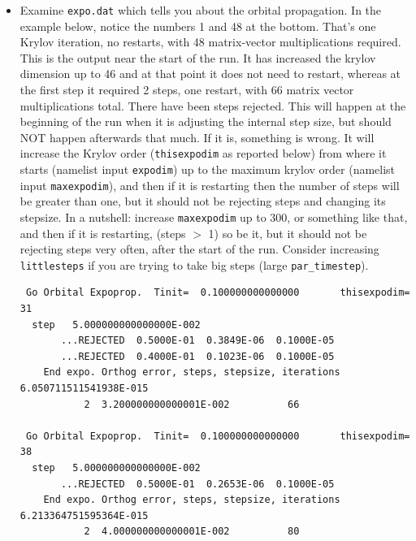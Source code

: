 \documentclass[10pt,leqno, oneside]{book}
\begin{document}
\begin{itemize}
{}
\item{Examine \verb#expo.dat# which tells you about the orbital propagation.  
In the example below, notice the numbers 1 and 48 at the bottom.  That's one Krylov iteration, no restarts, with 48 matrix-vector multiplications required.
This is the output near the start of the run.  It has increased the krylov dimension up to 46 and at that point it does not need to restart, whereas
at the first step it required 2 steps, one restart, with 66 matrix vector multiplications total.  There have been steps rejected.  This
will happen at the beginning of the run when it is adjusting the internal step size, but should NOT happen afterwards that much.  If it is, something is wrong.  It will increase
the Krylov order (\verb#thisexpodim# as reported below) from where it starts (namelist input \verb#expodim#) up to
the maximum krylov order (namelist input \verb#maxexpodim#), and then if it is restarting then the number of steps will be greater than one, 
but it should not be rejecting steps and changing its stepsize.  In a nutshell: increase \verb#maxexpodim# up to 300, or something like that, and then if it is restarting, 
(steps $>$ 1) so be it, but it should not be rejecting steps very often, after the start of the run.  Consider increasing \verb#littlesteps# if you are trying to take big steps (large \verb#par_timestep#).
%
{\footnotesize
\begin{verbatim}
 Go Orbital Expoprop.  Tinit=  0.100000000000000       thisexpodim=          31 
  step   5.000000000000000E-002
       ...REJECTED  0.5000E-01  0.3849E-06  0.1000E-05
       ...REJECTED  0.4000E-01  0.1023E-06  0.1000E-05
    End expo. Orthog error, steps, stepsize, iterations  6.050711511541938E-015
           2  3.200000000000001E-002          66
 
 Go Orbital Expoprop.  Tinit=  0.100000000000000       thisexpodim=          38 
  step   5.000000000000000E-002
       ...REJECTED  0.5000E-01  0.2653E-06  0.1000E-05
    End expo. Orthog error, steps, stepsize, iterations  6.213364751595364E-015
           2  4.000000000000001E-002          80
 

\end{verbatim}}}
\end{itemize}
\end{document}

